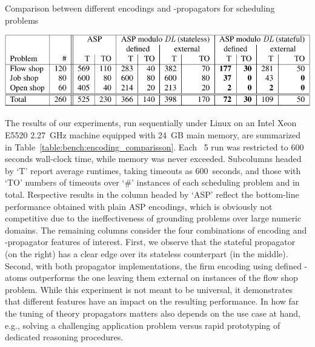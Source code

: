 \begin{table}
\caption{Comparison between different encodings and \DL-propagators for scheduling problems}
\centering
\includegraphics{tables/shop-scheduling}
\label{table:bench:encoding_comparisson}
\end{table}
The results of our experiments,
run sequentially under Linux on an Intel Xeon E5520 2.27~GHz machine equipped with 24~GB main memory,
are summarized in Table~\ref{table:bench:encoding_comparisson}.
%
Each \clingo~5 run was restricted to 600 seconds wall-clock time, while memory was never exceeded.
Subcolumns headed by  `T'  report average runtimes, taking timeouts as 600~seconds, and
those with  `TO'  numbers of timeouts over  `\#'  instances of each scheduling problem and
in total.
Respective results in the column headed by  `ASP'
reflect the bottom-line performance obtained with plain ASP encodings,
which is obviously not competitive due to the ineffectiveness of grounding
problems over large numeric domains.
%
The remaining columns consider the four combinations of encoding and \DL-propagator features of interest.
%
First,
we observe that the stateful propagator (on the right) has a clear edge over its stateless counterpart
(in the middle).
Second,
with both propagator implementations,
the firm encoding using defined \DL-atoms outperforms the one leaving them external
on instances of the flow shop problem.
%
While this experiment is not meant to be universal,
it demonstrates that different features have an impact on the resulting performance.
%
In how far the tuning of theory propagators matters also depends on the use case at hand, e.g.,
solving a challenging application problem  versus rapid prototyping of dedicated reasoning procedures.

